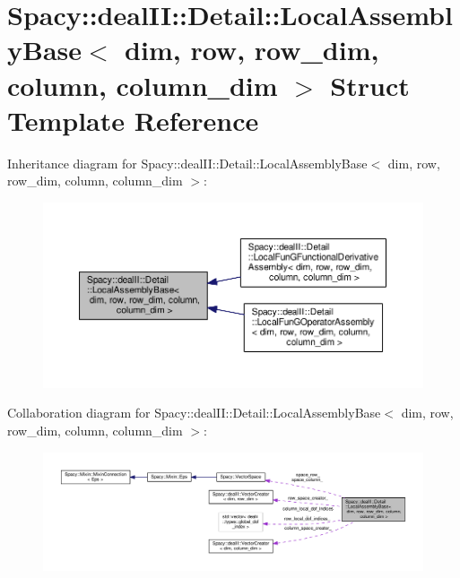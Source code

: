 \hypertarget{structSpacy_1_1dealII_1_1Detail_1_1LocalAssemblyBase}{\section{Spacy\-:\-:deal\-I\-I\-:\-:Detail\-:\-:Local\-Assembly\-Base$<$ dim, row, row\-\_\-dim, column, column\-\_\-dim $>$ Struct Template Reference}
\label{structSpacy_1_1dealII_1_1Detail_1_1LocalAssemblyBase}
}


Inheritance diagram for Spacy\-:\-:deal\-I\-I\-:\-:Detail\-:\-:Local\-Assembly\-Base$<$ dim, row, row\-\_\-dim, column, column\-\_\-dim $>$\-:
\nopagebreak
\begin{figure}[H]
\begin{center}
\leavevmode
\includegraphics[width=350pt]{structSpacy_1_1dealII_1_1Detail_1_1LocalAssemblyBase__inherit__graph}
\end{center}
\end{figure}


Collaboration diagram for Spacy\-:\-:deal\-I\-I\-:\-:Detail\-:\-:Local\-Assembly\-Base$<$ dim, row, row\-\_\-dim, column, column\-\_\-dim $>$\-:
\nopagebreak
\begin{figure}[H]
\begin{center}
\leavevmode
\includegraphics[width=350pt]{structSpacy_1_1dealII_1_1Detail_1_1LocalAssemblyBase__coll__graph}
\end{center}
\end{figure}
